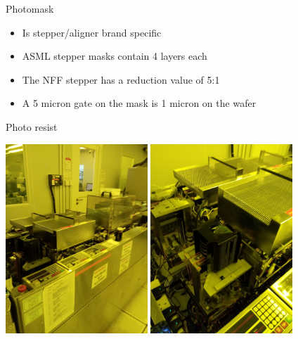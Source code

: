 \documentclass[9pt]{beamer}
\begin{document}
\begin{frame}{Photomask}
	\begin{itemize}
		\item Is stepper/aligner brand specific
		\item ASML stepper masks contain 4 layers each
		\item The NFF stepper has a reduction value of 5:1
		\item A 5 micron gate on the mask is 1 micron on the wafer
	\end{itemize}
\end{frame}

\begin{frame}{Photo resist}
\begin{center}
\includegraphics[width=0.4\textwidth]{images/20181128_154907.jpg}
\includegraphics[width=0.4\textwidth]{images/20181128_154911.jpg}
\end{center}
\end{frame}
\end{document}
